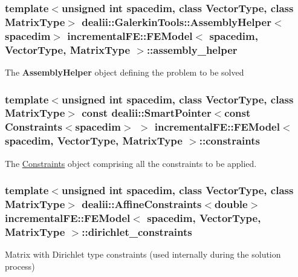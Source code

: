 \subsubsection[{\texorpdfstring{assembly\+\_\+helper}{assembly_helper}}]{\setlength{\rightskip}{0pt plus 5cm}template$<$unsigned int spacedim, class Vector\+Type, class Matrix\+Type$>$ dealii\+::\+Galerkin\+Tools\+::\+Assembly\+Helper$<$spacedim$>$ {\bf incremental\+F\+E\+::\+F\+E\+Model}$<$ spacedim, {\bf Vector\+Type}, Matrix\+Type $>$\+::assembly\+\_\+helper\hspace{0.3cm}{\ttfamily [private]}}\hypertarget{classincremental_f_e_1_1_f_e_model_a05d117d3d24815875729bf0219efb95a}{}\label{classincremental_f_e_1_1_f_e_model_a05d117d3d24815875729bf0219efb95a}
The {\bf Assembly\+Helper} object defining the problem to be solved 
\subsubsection[{\texorpdfstring{constraints}{constraints}}]{\setlength{\rightskip}{0pt plus 5cm}template$<$unsigned int spacedim, class Vector\+Type, class Matrix\+Type$>$ const dealii\+::\+Smart\+Pointer$<$const {\bf Constraints}$<$spacedim$>$ $>$ {\bf incremental\+F\+E\+::\+F\+E\+Model}$<$ spacedim, {\bf Vector\+Type}, Matrix\+Type $>$\+::constraints\hspace{0.3cm}{\ttfamily [private]}}\hypertarget{classincremental_f_e_1_1_f_e_model_a86375a464ff76f02e74db667f453c6fa}{}\label{classincremental_f_e_1_1_f_e_model_a86375a464ff76f02e74db667f453c6fa}
The \hyperlink{classincremental_f_e_1_1_constraints}{Constraints} object comprising all the constraints to be applied. 
\subsubsection[{\texorpdfstring{dirichlet\+\_\+constraints}{dirichlet_constraints}}]{\setlength{\rightskip}{0pt plus 5cm}template$<$unsigned int spacedim, class Vector\+Type, class Matrix\+Type$>$ dealii\+::\+Affine\+Constraints$<$double$>$ {\bf incremental\+F\+E\+::\+F\+E\+Model}$<$ spacedim, {\bf Vector\+Type}, Matrix\+Type $>$\+::dirichlet\+\_\+constraints\hspace{0.3cm}{\ttfamily [private]}}\hypertarget{classincremental_f_e_1_1_f_e_model_a305f5762e5476d48921f6c371df0ab41}{}\label{classincremental_f_e_1_1_f_e_model_a305f5762e5476d48921f6c371df0ab41}
Matrix with Dirichlet type constraints (used internally during the solution process) 
